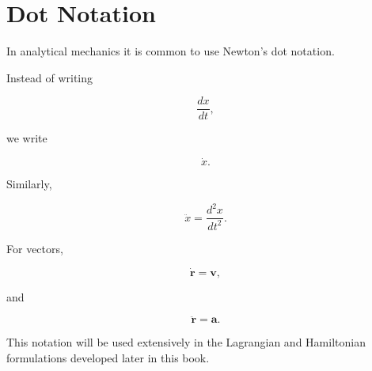 \section{Dot Notation}

In analytical mechanics it is common to use Newton's dot notation.

Instead of writing

\[
\frac{dx}{dt},
\]

we write

\[
\boxed{
	\dot x.
}
\]

Similarly,

\[
\boxed{
	\ddot x
	=
	\frac{d^2x}{dt^2}.
}
\]

For vectors,

\[
\boxed{
	\dot{\mathbf r}
	=
	\mathbf v,
}
\]

and

\[
\boxed{
	\ddot{\mathbf r}
	=
	\mathbf a.
}
\]

This notation will be used extensively in the Lagrangian and Hamiltonian
formulations developed later in this book.

